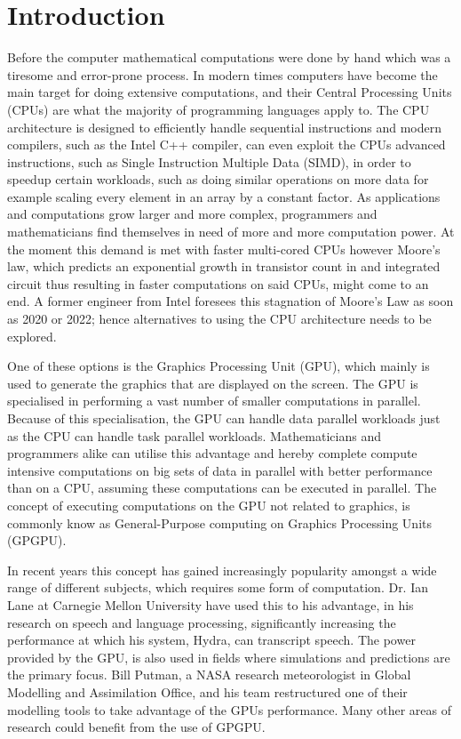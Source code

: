 \chapter{Introduction} %
\label{cha:introduction}
Before the computer mathematical computations were done by hand which was a tiresome and error-prone process.
In modern times computers have become the main target for doing extensive computations, and their Central Processing Units (CPUs) are what the majority of programming languages apply to.
The CPU architecture is designed to efficiently handle sequential instructions and modern compilers, such as the Intel C++ compiler, can even exploit the CPUs advanced instructions, such as Single Instruction Multiple Data (SIMD), in order to speedup certain workloads, such as doing similar operations on more data for example scaling every element in an array by a constant factor. \citep{INTEL_SIMD}
As applications and computations grow larger and more complex, programmers and mathematicians find themselves in need of more and more computation power. \citep[pp. 4]{OpenCL_AMD}
At the moment this demand is met with faster multi-cored CPUs however Moore's law, which predicts an exponential growth in transistor count in and integrated circuit thus resulting in faster computations on said CPUs, might come to an end.
A former engineer from Intel foresees this stagnation of Moore's Law as soon as 2020 or 2022; hence alternatives to using the CPU architecture needs to be explored. \citep{Moore2013}

One of these options is the Graphics Processing Unit (GPU), which mainly is used to generate the graphics that are displayed on the screen.
The GPU is specialised in performing a vast number of smaller computations in parallel.
Because of this specialisation, the GPU can handle data parallel workloads just as the CPU can handle task parallel workloads.
Mathematicians and programmers alike can utilise this advantage and hereby complete compute intensive computations on big sets of data in parallel with better performance than on a CPU, assuming these computations can be executed in parallel.
The concept of executing computations on the GPU not related to graphics, is commonly know as General-Purpose computing on Graphics Processing Units (GPGPU).

In recent years this concept has gained increasingly popularity amongst a wide range of different subjects, which requires some form of computation.
Dr. Ian Lane at Carnegie Mellon University have used this to his advantage, in his research on speech and language processing, significantly increasing the performance at which his system, Hydra, can transcript speech. \citep{NvidiaSpotlightIan}
The power provided by the GPU, is also used in fields where simulations and predictions are the primary focus. 
Bill Putman, a NASA research meteorologist in Global Modelling and Assimilation Office, and his team restructured one of their modelling tools to take advantage of the GPUs performance. \citep{NvidiaSpotlightNasa}
Many other areas of research could benefit from the use of GPGPU.

